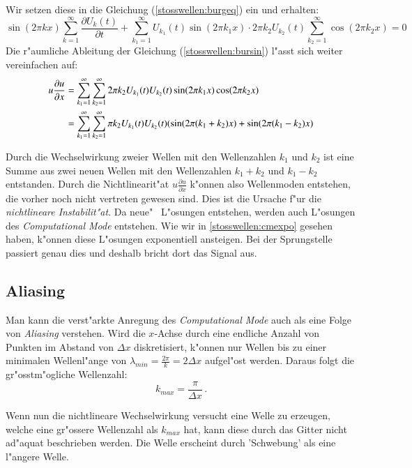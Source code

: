 \begin{refsection}
Wir setzen diese in die Gleichung (\ref{stosswellen:burgeq}) ein und erhalten:
\begin{equation}
	\sin(2\pi k x) \sum_{k=1}^{\infty} \frac{\partial U_{k}(t)}{\partial t} + \sum_{k_{1}=1}^{\infty} U_{k_{1}}(t) \sin(2\pi k_{1}x) \cdot 2\pi k_{2} U_{k_{2}}(t) \sum_{k_{2}=1}^{\infty} \cos (2\pi k_{2} x)
	= 0
	\label{stosswellen:bursin}
\end{equation}
Die r"aumliche Ableitung der Gleichung (\ref{stosswellen:bursin}) l"asst
sich weiter vereinfachen auf:
\begin{align}
	u\frac{\partial u}{\partial x} &= 
	\sum_{k_{1}=1}^{\infty} \sum_{k_{2}=1}^{\infty} 2 \pi k_{2} U_{k_{1}}(t) U_{k_{2}}(t) \sin (2\pi k_{1}x) \cos (2\pi k_{2}x) \notag\\
	&= \sum_{k_{1}=1}^{\infty} \sum_{k_{2}=1}^{\infty} \pi k_{2} U_{k_{1}}(t) U_{k_{2}}(t) (\sin (2\pi (k_{1}+k_{2})x) + \sin(2\pi (k_{1}-k_{2})x)
\end{align}

Durch die Wechselwirkung zweier Wellen mit den Wellenzahlen $k_{1}$
und $k_{2}$ ist eine Summe aus zwei neuen Wellen mit den Wellenzahlen
$k_{1}\!+\!k_{2}$ und $k_{1}\!-\!k_{2}$ entstanden. Durch die
Nichtlinearit"at $u\frac{\partial u}{\partial x}$ k"onnen also Wellenmoden
entstehen, die vorher noch nicht vertreten gewesen sind. Dies ist die
Ursache f"ur die \textit{nichtlineare Instabilit"at}. Da  \grqq neue"
\, L"osungen entstehen, werden auch L"osungen des \textit{Computational
Mode} entstehen. Wie wir in \ref{stosswellen:cmexpo} gesehen haben,
k"onnen diese L"osungen exponentiell ansteigen. Bei der Sprungstelle
passiert genau dies und deshalb bricht dort das Signal aus. 

\subsection{Aliasing}
Man kann die verst"arkte Anregung des \textit{Computational Mode} auch
als eine Folge von \textit{Aliasing} verstehen. Wird die $x$-Achse durch
eine endliche Anzahl von Punkten im Abstand von $\Delta x$ diskretisiert,
k"onnen nur Wellen bis zu einer minimalen Wellenl"ange von $\lambda_{min}
\!=\! \frac{2 \pi}{k}\! = \! 2 \Delta x$ aufgel"ost werden. Daraus folgt
die gr"osstm"ogliche Wellenzahl:
\begin{equation}
	k_{max} = \frac{\pi}{\Delta x}\,.
\end{equation}

Wenn nun die nichtlineare Wechselwirkung versucht eine Welle zu erzeugen,
welche eine gr"ossere Wellenzahl als $k_{max}$ hat, kann diese durch
das Gitter nicht ad"aquat beschrieben werden. Die Welle erscheint durch
'Schwebung' als eine l"angere Welle. 


\end{refsection}
